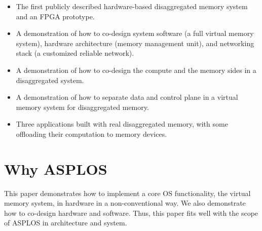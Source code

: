 \begin{itemize}

\item The first publicly described hardware-based disaggregated memory system and an FPGA prototype.

\item A demonstration of how to co-design system software (a full virtual memory system), hardware architecture (memory management unit), and networking stack (a customized reliable network).

\item A demonstration of how to co-design the compute and the memory sides in a disaggregated system.

\item A demonstration of how to separate data and control plane in a virtual memory system for disaggregated memory.

\item Three applications built with real disaggregated memory, with some offloading their computation to memory devices.



\end{itemize}



\section{Why ASPLOS}
This paper demonstrates how to implement a core OS functionality, the virtual memory system, in hardware in a non-conventional way.
We also demonstrate how to co-design hardware and software.
Thus, this paper fits well with the scope of ASPLOS in
architecture and system.
 
\pagebreak
%
%


%

